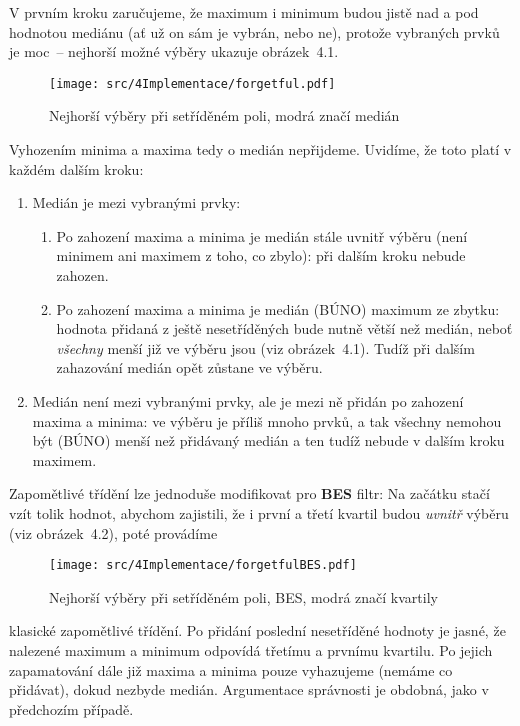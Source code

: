         V prvním kroku zaručujeme, že maximum i minimum budou jistě nad a pod hodnotou mediánu (ať už on sám je vybrán, nebo ne), protože vybraných prvků je \bq moc\eq ~-- nejhorší možné výběry ukazuje obrázek~4.1.
        \begin{figure}[h]
        \begin{center}
          \texttt{[image: src/4Implementace/forgetful.pdf]}
          \caption{Nejhorší výběry při setříděném poli, modrá značí medián}
          \end{center}
        \end{figure}\label{obr forgetful}
        Vyhozením minima a maxima tedy o medián nepřijdeme. Uvidíme, že toto platí v každém dalším kroku:
        \begin{enumerate}
          \item Medián je mezi vybranými prvky:
            \begin{enumerate}
                \item Po zahození maxima a minima je medián stále uvnitř výběru (není minimem ani maximem z toho, co zbylo): při dalším kroku nebude zahozen.
                \item Po zahození maxima a minima je medián (BÚNO) maximum ze zbytku: hodnota přidaná z ještě nesetříděných bude nutně větší než medián, neboť \emph{všechny} menší již ve výběru jsou (viz obrázek~4.1). Tudíž při dalším zahazování medián opět zůstane ve výběru.
            \end{enumerate}
          \item Medián není mezi vybranými prvky, ale je mezi ně přidán po zahození maxima a minima: ve výběru je příliš mnoho prvků, a tak všechny nemohou být (BÚNO) menší než přidávaný medián a ten tudíž nebude v dalším kroku maximem.
        \end{enumerate}

        Zapomětlivé třídění lze jednoduše modifikovat pro \textbf{BES} filtr: Na začátku stačí vzít tolik hodnot, abychom zajistili, že i první a třetí kvartil budou \emph{uvnitř} výběru (viz obrázek~4.2), poté provádíme
        \begin{figure}[h]
        \begin{center}
          \texttt{[image: src/4Implementace/forgetfulBES.pdf]}
          \caption{Nejhorší výběry při setříděném poli, BES, modrá značí kvartily}
          \end{center}
        \end{figure}\label{obr forget BES}
        klasické zapomětlivé třídění. Po přidání poslední nesetříděné hodnoty je jasné, že nalezené maximum a minimum odpovídá třetímu a prvnímu kvartilu. Po jejich zapamatování dále již maxima a minima pouze vyhazujeme (nemáme co přidávat), dokud nezbyde medián. Argumentace správnosti je obdobná, jako v předchozím případě.

